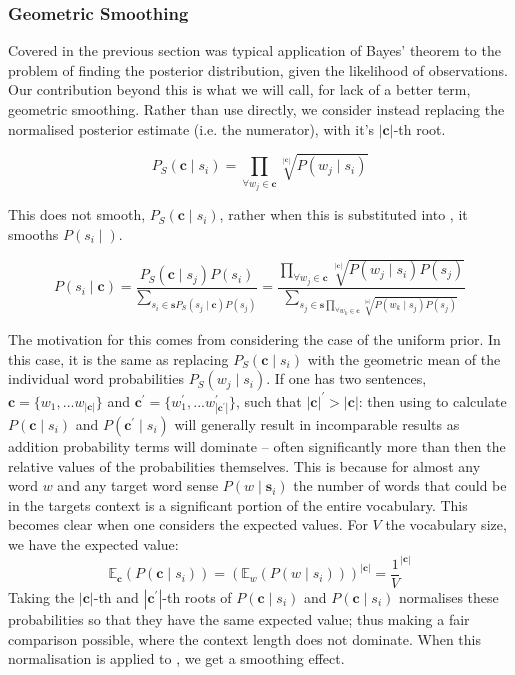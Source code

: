 \documentclass{sig-alternate}
\renewcommand{\c}{\mathbf{c}}
\newcommand{\s}{\mathbf{s}}
\begin{document}
\subsubsection{Geometric Smoothing}
Covered in the previous section was typical application of Bayes' theorem to the problem of finding the posterior distribution, given the likelihood of observations.
Our contribution beyond this is what we will call, for lack of a better term, geometric smoothing.
Rather than use  directly, we consider instead replacing the normalised posterior estimate (i.e. the numerator), with it's $|\c|$-th root.

\begin{equation} \label{eq:contrextprobsmooth}
P_S(\c \mid s_{i})=\prod_{\forall w_{j}\in\c}\sqrt[|\c|]{P(w_{j} \mid s_{i})}
\end{equation}

This does not smooth, $P_S(\c \mid s_{i})$, rather when this is substituted into , it smooths $P(s_{i} \mid )$.

\begin{equation} \label{eq:generalwsdsmoothed}
P(s_{i}\mid\c)=\dfrac{P_{S}(\c\mid s_{j})P(s_{i})}{\sum_{s_{i}\in\s P_{S}(s_{j}\mid\c)P(s_{j})}}=\dfrac{\prod_{\forall w_{j}\in\c}\sqrt[|\c|]{P(w_{j}\mid s_{i})P(s_{j})}}{\sum_{s_{j}\in\s\prod_{\forall w_{k}\in\c}\sqrt[|\c|]{P(w_{k}\mid s_{j})P(s_{j})}}}
\end{equation}

The motivation for this comes from considering the case of the uniform prior.
In this case, it is the same as replacing $P_S(\c \mid s_{i})$ with the geometric mean of the individual word probabilities $P_S(w_j \mid s_{i})$.
If one has two sentences, $\c=\{w_1,...w_{|\c|}\}$ and $\c^\prime=\{w_1^\prime,...w^\prime_{|\c^\prime|}\}$, such that $|\c|^\prime > |\c|$:
then using  to calculate $P(\c \mid s_{i})$ and $P(\c^\prime \mid s_{i})$ will generally result in incomparable results as addition probability terms will dominate -- often significantly more than then the relative values of the probabilities themselves. This is because for almost any word $w$ and any target word sense $P(w \mid \s_i)$ the number of words that could be in the targets context is a significant portion of the entire vocabulary.
This becomes clear when one considers the expected values. For $V$ the vocabulary size, we have the expected value:
\begin{equation} \label{eq:expectcontexprob}
\mathbb{E}_\c(P(\c \mid s_{i}))
=(\mathbb{E}_w(P(w \mid s_i)))^{|\c|}
= \frac{1}{V}^{|\c|}
\end{equation}
Taking the $|\c|$-th and $|\c^\prime|$-th roots of $P(\c \mid s_{i})$ and $P(\c \mid s_{i})$ normalises these probabilities so that they have the same expected value; thus making a fair comparison possible, where the context length does not dominate.
When this normalisation is applied to , we get a smoothing effect.
\end{document}

